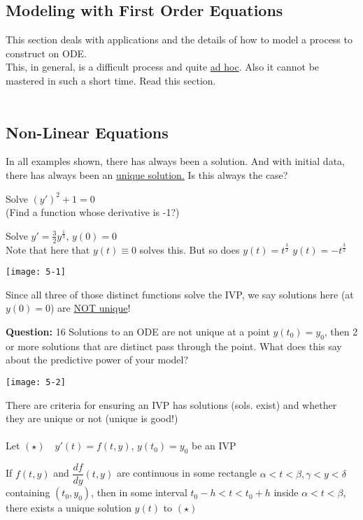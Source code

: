 \subsection*{Modeling with First Order Equations}
This section deals with applications and the details of how to model a process to construct on ODE.\\
This, in general, is a difficult process and quite \underline{ad hoc}. Also it cannot be mastered in such a short time. Read this section.\\
\redhline\\
\subsection*{Non-Linear Equations}
In all examples shown, there has always been a solution. And with initial data, there has always been an \underline{unique solution.}
Is this always the case?\\
\begin{example-N}
	Solve $(y')^2 + 1 = 0$\\
	(Find a function whose derivative is -1?)
\end{example-N}
\begin{example-N}
	Solve $y' = \frac{3}{2} y^{\frac{1}{3}}$, $y(0)=0$\\
	Note that here that  $y(t) \equiv 0$ solves this. But so does  $y(t) = t^{\frac{3}{2}}$ \quad  {} $y(t) = -t^{\frac{3}{2}}$
	\begin{center}
	\texttt{[image: 5-1]}		
	\end{center}

	Since all three of those distinct functions solve the IVP, we say solutions here (at $y(0)=0$) are \underline{NOT unique}!\\
\end{example-N}
\textbf{Question: } 16 Solutions to an ODE are not unique at a point $y(t_0) = y_0$, then 2 or more solutions that are distinct pass through the point. What does this say about the predictive power of your model?
\begin{center}
	\texttt{[image: 5-2]}
\end{center}
There are criteria for ensuring an IVP has solutions (sols. exist) and whether they are unique or not (unique is good!)\\\\
Let $(\star)\quad  y'(t) = f(t,y)$, $y(t_0) = y_0$ be an IVP
\begin{theorem-N}
	If $f(t,y)$ and $\dfrac{df}{dy}(t,y)$ are continuous in some rectangle $\alpha < t < \beta, \gamma < y < \delta$ containing $(t_0, y_0)$, then in some interval $t_0 - h < t < t_0 + h$ inside $\alpha < t < \beta$, there exists a unique solution $y(t)$ to $(\star)$\\
\end{theorem-N}

